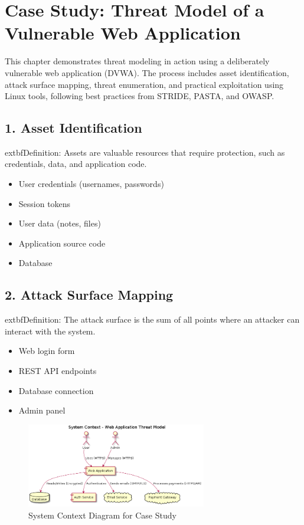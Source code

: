 
\section*{Case Study: Threat Model of a Vulnerable Web Application}
This chapter demonstrates threat modeling in action using a deliberately vulnerable web application (DVWA)\cite{owasp}. The process includes asset identification, attack surface mapping, threat enumeration, and practical exploitation using Linux tools, following best practices from STRIDE, PASTA, and OWASP\cite{shostack2014,uceda2015,owasp}.

\subsection*{1. Asset Identification}
	extbf{Definition:} Assets are valuable resources that require protection, such as credentials, data, and application code\cite{nist800154}.
\begin{itemize}
	\item User credentials (usernames, passwords)
	\item Session tokens
	\item User data (notes, files)
	\item Application source code
	\item Database
\end{itemize}

\subsection*{2. Attack Surface Mapping}
	extbf{Definition:} The attack surface is the sum of all points where an attacker can interact with the system\cite{owasp}.
\begin{itemize}
	\item Web login form
	\item REST API endpoints
	\item Database connection
	\item Admin panel
\end{itemize}
\begin{figure}[H]
	\centering
	\includegraphics[width=0.7\textwidth]{images/system-context}
	\caption{System Context Diagram for Case Study}
\end{figure}

